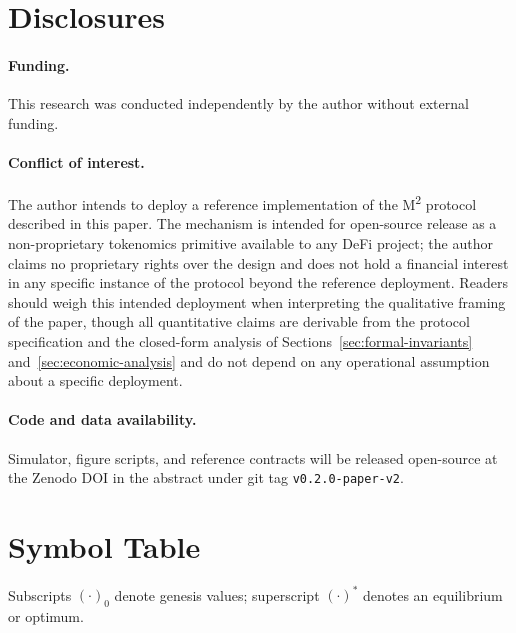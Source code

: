 \documentclass[11pt,a4paper]{article}
\theoremstyle{plain}
\theoremstyle{definition}
\theoremstyle{remark}
\begin{document}
\section*{Disclosures}

\paragraph{Funding.} This research was conducted independently by the author without external funding.

\paragraph{Conflict of interest.} The author intends to deploy a reference implementation of the M\textsuperscript{2} protocol described in this paper. The mechanism is intended for open-source release as a non-proprietary tokenomics primitive available to any DeFi project; the author claims no proprietary rights over the design and does not hold a financial interest in any specific instance of the protocol beyond the reference deployment. Readers should weigh this intended deployment when interpreting the qualitative framing of the paper, though all quantitative claims are derivable from the protocol specification and the closed-form analysis of Sections~\ref{sec:formal-invariants} and~\ref{sec:economic-analysis} and do not depend on any operational assumption about a specific deployment.

\paragraph{Code and data availability.} Simulator, figure scripts, and reference contracts will be released open-source at the Zenodo DOI in the abstract under git tag \texttt{v0.2.0-paper-v2}.

{\footnotesize


}

\appendix

\section{Symbol Table}
\label{app:symbols}

Subscripts $(\cdot)_0$ denote genesis values; superscript $(\cdot)^*$ denotes an equilibrium or optimum.
\end{document}
